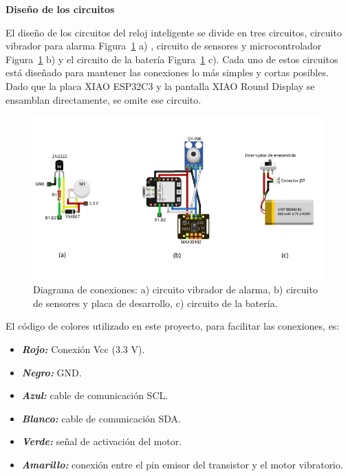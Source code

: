 \documentclass[
  12pt,
  letterpaper,
  DIV=11,
  numbers=noendperiod]{scrreport}
\providecommand{\tightlist}{%
  \setlength{\itemsep}{0pt}\setlength{\parskip}{0pt}}\usepackage{longtable,booktabs,array}
\begin{document}
\textbf{Diseño de los circuitos}

El diseño de los circuitos del reloj inteligente se divide en tres
circuitos, circuito vibrador para alarma Figura~\ref{fig-conexiones} a)
, circuito de sensores y microcontrolador Figura~\ref{fig-conexiones} b)
y el circuito de la batería Figura~\ref{fig-conexiones} c). Cada uno de
estos circuitos está diseñado para mantener las conexiones lo más
simples y cortas posibles. Dado que la placa XIAO ESP32C3 y la pantalla
XIAO Round Display se ensamblan directamente, se omite ese circuito.

\begin{figure}

{\centering \includegraphics{Capitulos/../Imagenes/Diagrama de conexiones.png}

}

\caption{\label{fig-conexiones}Diagrama de conexiones: a) circuito
vibrador de alarma, b) circuito de sensores y placa de desarrollo, c)
circuito de la batería.}

\end{figure}

El código de colores utilizado en este proyecto, para facilitar las
conexiones, es:

\begin{itemize}
\tightlist
\item
  \textbf{\emph{Rojo:}} Conexión Vcc (3.3 V).
\item
  \textbf{\emph{Negro:}} GND.
\item
  \textbf{\emph{Azul:}} cable de comunicación SCL.
\item
  \textbf{\emph{Blanco:}} cable de comunicación SDA.
\item
  \textbf{\emph{Verde:}} señal de activación del motor.
\item
  \textbf{\emph{Amarillo:}} conexión entre el pin emisor del transistor
  y el motor vibratorio.
\end{itemize}
\end{document}
